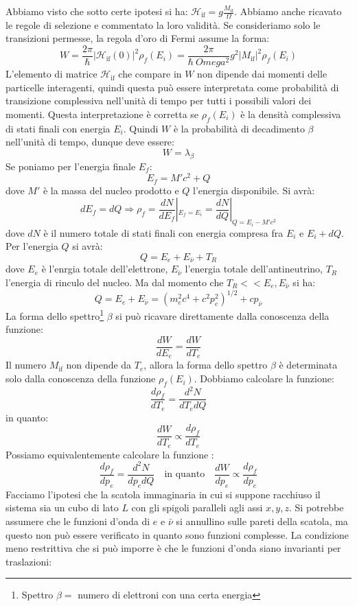 Abbiamo visto che sotto certe ipotesi si ha: 
$\mathcal{H}_{\text{if}}=g\frac{M_{\text{if}}}{\Omega}$.
Abbiamo anche ricavato le regole di selezione e commentato la loro validità. Se
consideriamo solo le transizioni permesse, la regola d'oro di Fermi assume la
forma:
\[
W=\frac{2\pi}{\hbar}|\mathcal{H}_{\text{if}}(0)|^2\rho_f(E_i)=\frac{2\pi}{\hbar\
Omega^2}g^2|M_{\text{if}}|^2\rho_f(E_i)
\]
L'elemento di matrice $\mathcal{H}_{\text{if}}$ che compare in $W$ non dipende
dai momenti delle particelle interagenti, quindi questa può essere interpretata
come probabilità di transizione
complessiva nell'unità di tempo per tutti i possibili valori dei momenti. 
Questa
interpretazione è corretta se $\rho_f(E_i)$ è la densità complessiva di stati
finali con energia $E_i$.
Quindi $W$ è la probabilità di decadimento $\beta$ nell'unità di tempo, 
dunque deve essere:
\[
W=\lambda_{\beta}
\]
Se poniamo per l'energia finale $E_f$:
\[
E_f=M'c^2+Q
\]
dove $M'$ è la massa del nucleo prodotto e $Q$ l'energia disponibile. Si avrà:
\[
dE_f=dQ\Rightarrow\rho_f=\frac{dN}{dE_f}|_{E_f=E_i}=\frac{dN}{dQ}|_{Q=E_i-M'c^2}
\]
dove $dN$ è il numero totale di stati finali con energia compresa fra $E_i$ e
$E_i+dQ$. Per l'energia $Q$ si avrà:
\[
Q=E_e+E_{\bar{\nu}}+T_R
\]
dove $E_e$ è l'enrgia totale dell'elettrone, $E_{\bar{\nu}}$ l'energia totale
dell'antineutrino, $T_R$ l'energia di rinculo del nucleo.
Ma dal momento che $T_R<<E_e,E_{\bar{\nu}}$ si ha:
\[
Q=E_e+E_{\bar{\nu}}=(m_e^2c^4+c^2p_e^2)^{1/2}+cp_{\bar{\nu}}
\]
La forma dello spettro\footnote{Spettro $\beta=$ numero di elettroni con una
certa energia} $\beta$ si può ricavare direttamente dalla conoscenza della
funzione:
\[
\frac{dW}{dE_e}=\frac{dW}{dT_e}
\]
Il numero $M_{\text{if}}$ non dipende da $T_e$, allora la forma dello spettro
$\beta$ è determinata solo dalla conoscenza della funzione $\rho_f(E_i)$.
Dobbiamo calcolare la funzione:
\[
\frac{d\rho_f}{dT_e}=\frac{d^2N}{dT_edQ}
\]
in quanto:
\[
\frac{dW}{dT_e}\propto\frac{d\rho_f}{dT_e}
\]
Possiamo equivalentemente calcolare la funzione :
\[
\frac{d\rho_f}{dp_e}=\frac{d^2N}{dp_edQ}\quad\text{in 
quanto}\quad\frac{dW}{dp_e}\propto\frac{d\rho_f}{dp_e}
\]
Facciamo l'ipotesi che la scatola immaginaria in cui si suppone racchiuso il 
sistema sia un cubo di lato $L$ con gli spigoli paralleli agli assi $x,y,z$. Si 
potrebbe assumere che le
funzioni d'onda di $e$ e $\bar{\nu}$ si annullino sulle pareti della scatola, 
ma questo non può essere verificato in quanto sono funzioni complesse. La 
condizione meno restrittiva che si può
imporre è che le funzioni d'onda siano invarianti per traslazioni:
